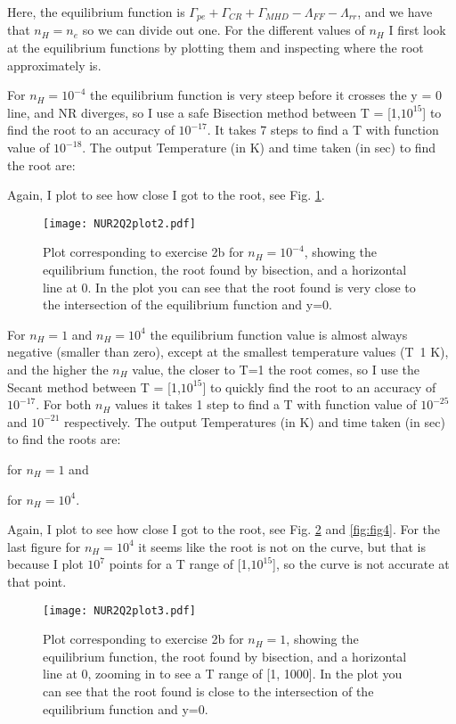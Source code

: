 Here, the equilibrium function is $\Gamma_{pe} + \Gamma_{CR} + \Gamma_{MHD} - \Lambda_{FF} - \Lambda_{rr}$, and we have that $n_H = n_e$ so we can divide out one. 
For the different values of $n_H$ I first look at the equilibrium functions by plotting them and inspecting where the root approximately is. 

For $n_H = 10^{-4}$ the equilibrium function is very steep before it crosses the y = 0 line, and NR diverges, so I use a safe Bisection method between T = [1,$10^{15}$] to find the root to an accuracy of $10^{-17}$. It takes 7 steps to find a T with function value of $10^{-18}$.
The output Temperature (in K) and time taken (in sec) to find the root are:


Again, I plot to see how close I got to the root, see Fig. \ref{fig:fig2}.

\begin{figure}[h!]
  \centering
  \texttt{[image: NUR2Q2plot2.pdf]}
  \caption{Plot corresponding to exercise 2b for $n_H = 10^{-4}$, showing the equilibrium function, the root found by bisection, and a horizontal line at 0. In the plot you can see that the root found is very close to the intersection of the equilibrium function and y=0.}
  \label{fig:fig2}
\end{figure} 


For $n_H = 1$ and $n_H = 10^4$ the equilibrium function value is almost always negative (smaller than zero), except at the smallest temperature values (T~1 K), and the higher the $n_H$ value, the closer to T=1 the root comes, so I use the Secant method between T = [1,$10^{15}$] to quickly find the root to an accuracy of $10^{-17}$. 
For both $n_H$ values it takes 1 step to find a T with function value of $10^{-25}$ and $10^{-21}$ respectively.
The output Temperatures (in K) and time taken (in sec) to find the roots are:

for $n_H = 1$ and 

for $n_H = 10^4$.

Again, I plot to see how close I got to the root, see Fig. \ref{fig:fig3} and \ref{fig:fig4}. For the last figure for $n_H = 10^4$ it seems like the root is not on the curve, but that is because I plot $10^7$ points for a T range of [1,$10^{15}$], so the curve is not accurate at that point.


\begin{figure}[h!]
  \centering
  \texttt{[image: NUR2Q2plot3.pdf]}
  \caption{Plot corresponding to exercise 2b for $n_H = 1$, showing the equilibrium function, the root found by bisection, and a horizontal line at 0, zooming in to see a T range of [1, 1000]. In the plot you can see that the root found is close to the intersection of the equilibrium function and y=0.}
  \label{fig:fig3}
\end{figure} 

